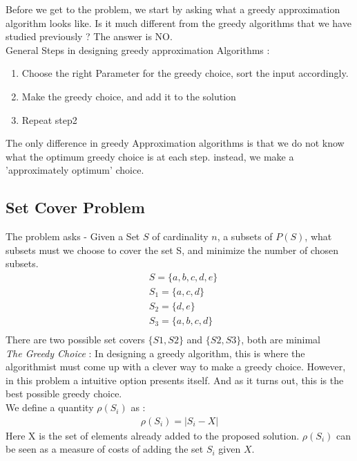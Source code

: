 \documentclass[12pt]{report}
\begin{document}
Before we get to the problem, we start by asking what a greedy approximation algorithm looks like. Is it much different from the greedy algorithms that we have studied previously ? The answer is NO.\\
General Steps in designing greedy approximation Algorithms :
\begin{enumerate}
  \item Choose the right Parameter for the greedy choice, sort the input accordingly.
  \item Make the greedy choice, and add it to the solution
  \item Repeat step2
\end{enumerate}
The only difference in greedy Approximation algorithms is that we do not know what the optimum greedy choice is at each step. instead, we make a 'approximately optimum' choice.

\subsection*{Set Cover Problem}
The problem asks - Given a Set $S$ of cardinality $n$, a subsets of $P(S)$, what subsets must we choose to cover the set S, and minimize the number of chosen subsets.
\begin{align*}
& S = \{a, b, c, d, e\} \\
& S_1 = \{a, c, d\}   \\
& S_2 = \{d, e\}     \\
& S_3 = \{a, b, c, d\}\\
\end{align*}
There are two possible set covers $\{S1, S2\}$ and $\{S2, S3\}$, both are minimal \\

\emph{The Greedy Choice} : In designing a greedy algorithm, this is where the algorithmist must come up with a clever way to make a greedy choice. However, in this problem a intuitive option presents itself. And as it turns out, this is the best possible greedy choice. \\
We define a quantity $\rho(S_i)$ as :
\begin{align*}
\rho(S_i) = |S_i - X| 
\end{align*}
Here X is the set of elements already added to the proposed solution.
$\rho(S_i)$ can be seen as a measure of costs of adding the set $S_i$ given $X$.\\
\end{document}
